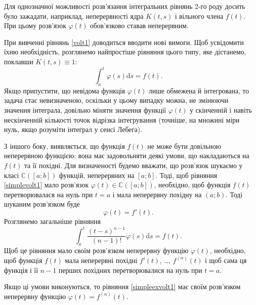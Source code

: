 \documentclass[14pt,twoside]{extreport}
\theoremstyle{mystyle}
\numberwithin{equation}{chapter}
\newcommand{\cab}{\mathbb{C}([a; b])}
\begin{document}
Для однозначної можливості розв'язання інтегральних рівнянь 2-го роду досить було зажадати, наприклад, неперервності ядра $K(t, s)$ і вільного члена $f(t)$. При цьому розв'язок $\varphi(t)$ обов'язково ставав неперервним.

При вивченні рівнянь \eqref{volt1} доводиться вводити нові вимоги. Щоб усвідомити їхню необхідність, розглянемо найпростіше рівняння цього типу, яке дістанемо, поклавши $K(t, s) \equiv 1$:
\begin{equation}\label{simplevolt1}
\int_{a}^{t} \varphi(s) \mathrm{d}s = f(t).
\end{equation}
Якщо припустити, що невідома функція $\varphi(t)$ лише обмежена й інтегрована, то задача стає невизначеною, оскільки у цьому випадку можна, не змінюючи значення інтеграла, довільно міняти значення функції $\varphi(t)$ у скінченній і навіть нескінченній кількості точок відрізка інтегрування (точніше, на множині міри нуль, якщо розуміти інтеграл у сенсі Лебега).

З іншого боку, виявляється, що функція $f(t)$ не може бути довільною неперервною функцією: вона має задовольняти деякі умови, що накладаються на $f(t)$ та її похідні. Для визначеності будемо вважати, що розв'язок шукаємо у класі $\cab$ функцій, неперервних на $[a; b]$. Тоді, щоб рівняння \eqref{simplevolt1} мало розв'язок $\varphi(t) \in \cab$, необхідно, щоб функція $f(t)$ перетворювалася на нуль при $t = a$ і мала неперервну похідну на $(a; b)$. Тоді шуканим розв'язком буде
\[
\varphi(t) = f'(t).
\]
Розглянемо загальніше рівняння
\begin{equation}\label{simpleexvolt1}
\int_{a}^{t} \frac{(t-s)^{n-1}}{(n-1)!} \varphi(s) \mathrm{d}s = f(t).
\end{equation}
Щоб це рівняння мало своїм розв'язком неперервну функцію $\varphi(t)$, необхідно, щоб функція $f(t)$ мала неперервні похідні $f'(t)$, \ldots, $f^{(n)}(t)$ і щоб сама ця функція і її $n-1$ перших похідних перетворювалися на нуль при $t = a$.

Якщо ці умови виконуються, то рівняння \eqref{simpleexvolt1} має своїм розв'язком неперервну функцію $\varphi(t) = f^{(n)}(t)$.
\end{document}
